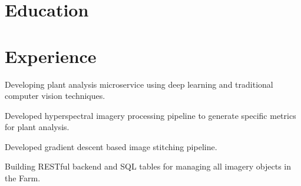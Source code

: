 \documentclass[]{deedy-resume-openfont}
\begin{document}
\hfill
\begin{minipage}[t]{0.70\textwidth} 

\section{Education}




\newcommand{\normalbold}[1]{\color{headings}\fontspec[Path = fonts/century-gothic/]{GOTHICB}\normalsize{#1}}


\begin{addmargin}[2em]{0em}%
\end{addmargin}




\sectionsep





\section{Experience}

\begin{tightemize}%

\item Developing plant analysis microservice using deep learning and traditional computer vision techniques. %
\item Developed hyperspectral imagery processing pipeline to generate specific metrics for plant analysis.
\item Developed gradient descent based image stitching pipeline.
\item Building RESTful backend and SQL tables for managing all imagery objects in the Farm.

\end{tightemize}
\sectionsep


\end{minipage}
\end{document}

